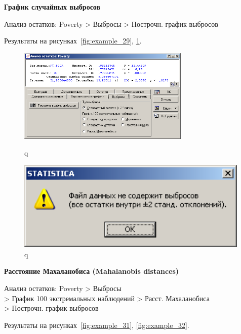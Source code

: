 \newpage

\textbf{График случайных выбросов}

Анализ остатков: Poverty > Выбросы > Построчн. график выбросов

Результаты на рисунках~\ref{fig:example_29}, \ref{fig:example_30}.

\begin{figure}[!h]
  \centering
  \begin{minipage}{0.49\textwidth}
    \centering

    \includegraphics[height=4.5cm]
    {inc/example_29.PNG}

    \caption{q}
    \label{fig:example_29}
  \end{minipage}
  \begin{minipage}{0.49\textwidth}
    \centering

    \includegraphics[width=0.99\textwidth]
    {inc/example_30.PNG}

    \caption{q}
    \label{fig:example_30}
  \end{minipage}
\end{figure}

\textbf{Расстояние Махаланобиса (Mahalanobis distances)}

Анализ остатков: Poverty > Выбросы\\
> График 100 экстремальных наблюдений > Расст. Махаланобиса\\
> Построчн. график выбросов

Результаты на рисунках~\ref{fig:example_31}, \ref{fig:example_32}.

